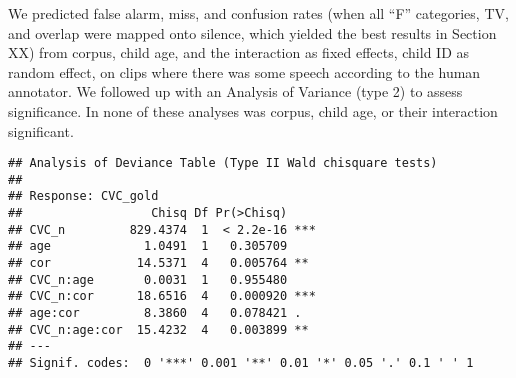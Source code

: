 \documentclass[english,floatsintext,man]{apa6}
\begin{document}
We predicted false alarm, miss, and confusion rates (when all
\enquote{F} categories, TV, and overlap were mapped onto silence, which
yielded the best results in Section XX) from corpus, child age, and the
interaction as fixed effects, child ID as random effect, on clips where
there was some speech according to the human annotator. We followed up
with an Analysis of Variance (type 2) to assess significance. In none of
these analyses was corpus, child age, or their interaction significant.

\begin{verbatim}
## Analysis of Deviance Table (Type II Wald chisquare tests)
## 
## Response: CVC_gold
##                  Chisq Df Pr(>Chisq)    
## CVC_n         829.4374  1  < 2.2e-16 ***
## age             1.0491  1   0.305709    
## cor            14.5371  4   0.005764 ** 
## CVC_n:age       0.0031  1   0.955480    
## CVC_n:cor      18.6516  4   0.000920 ***
## age:cor         8.3860  4   0.078421 .  
## CVC_n:age:cor  15.4232  4   0.003899 ** 
## ---
## Signif. codes:  0 '***' 0.001 '**' 0.01 '*' 0.05 '.' 0.1 ' ' 1
\end{verbatim}
\end{document}
